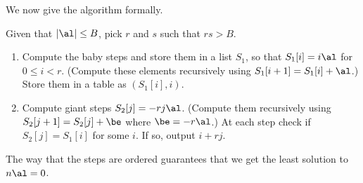 We now give the algorithm formally.
\begin{alg}
Given that $|\al|\le B$, pick $r$ and $s$ such that $rs>B$.
\begin{enumerate}
\item
Compute the baby steps and store them in a list $S_1$, so that $S_1[i]=i\al$ for $0\le i<r$. (Compute these elements recursively using $S_1[i+1]=S_1[i]+\al$.) Store them in a table as $(S_1[i],i)$.%
\item
Compute giant steps $S_2[j]=-rj\al$. (Compute them recursively using $S_2[j+1]=S_2[j]+\be$ where $\be = -r\al$.) At each step check if $S_2[j]=S_1[i]$ for some $i$. If so, output $i+rj$.
\end{enumerate}
\end{alg}
The way that the steps are ordered guarantees that we get the least solution to $n\al=0$.

